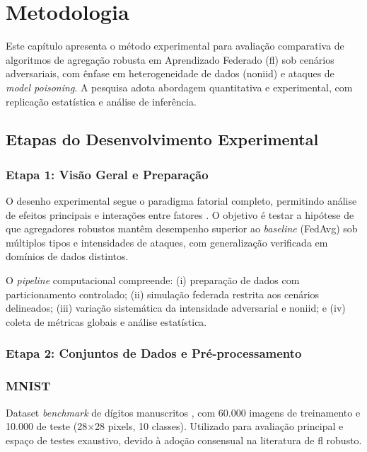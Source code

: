 \chapter{Metodologia}
\label{chap:metodologia}

Este capítulo apresenta o método experimental para avaliação comparativa 
de algoritmos de agregação robusta em Aprendizado Federado (\gls{fl}) sob 
cenários adversariais, com ênfase em heterogeneidade de dados (\gls{noniid}) 
e ataques de \textit{model poisoning}. A pesquisa adota abordagem 
quantitativa e experimental, com replicação estatística e análise de 
inferência.

\section{Etapas do Desenvolvimento Experimental}

\subsection{Etapa 1: Visão Geral e Preparação}

O desenho experimental segue o paradigma fatorial completo, 
permitindo análise de efeitos principais e interações entre fatores 
\cite{Montgomery2017}. O objetivo é testar a hipótese de que agregadores 
robustos mantêm desempenho superior ao \textit{baseline} (FedAvg) sob 
múltiplos tipos e intensidades de ataques, com generalização verificada em domínios de dados distintos.

O \textit{pipeline} computacional compreende: (i) preparação de dados com particionamento controlado; (ii) simulação federada restrita aos cenários delineados; (iii) variação sistemática da intensidade adversarial e \gls{noniid}; e (iv) coleta de métricas globais e análise estatística.

\subsection{Etapa 2: Conjuntos de Dados e Pré-processamento}

\subsection{MNIST}
Dataset \textit{benchmark} de dígitos manuscritos \cite{LeCun1998}, com 
60.000 imagens de treinamento e 10.000 de teste (28$\times$28 pixels, 
10 classes). Utilizado para avaliação principal e espaço de testes exaustivo, devido à adoção 
consensual na literatura de \gls{fl} robusto.

